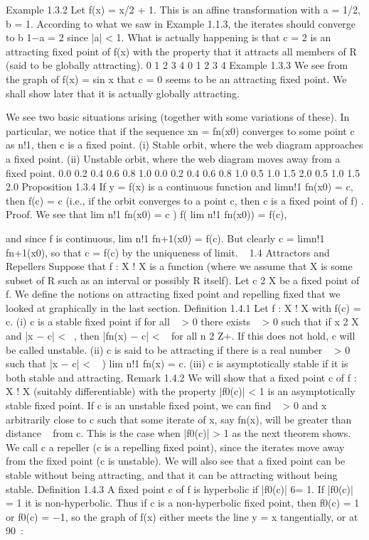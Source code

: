 \documentclass[12pt]{article}
\begin{document}
\begin{enumerate}
\begin{enumerate}
Example 1.3.2 Let f(x) = x/2 + 1. This is an affine transformation with a = 1/2,
b = 1. According to what we saw in Example 1.1.3, the iterates should converge to
b
1−a = 2 since |a| < 1. What is actually happening is that c = 2 is an attracting fixed
point of f(x) with the property that it attracts all members of R (said to be globally
attracting).
0 1 2 3 4
0
1
2
3
4
Example 1.3.3 We see from the graph of f(x) = sin x that c = 0 seems to be an
attracting fixed point. We shall show later that it is actually globally attracting.

We see two basic situations arising (together with some variations of these). In
particular, we notice that if the sequence xn = fn(x0) converges to some point c as
n!1, then c is a fixed point.
(i) Stable orbit, where the web diagram approaches a fixed point.
(ii) Unstable orbit, where the web diagram moves away from a fixed point.
0.0 0.2 0.4 0.6 0.8 1.0
0.0
0.2
0.4
0.6
0.8
1.0
0.5 1.0 1.5 2.0
0.5
1.0
1.5
2.0
Proposition 1.3.4 If y = f(x) is a continuous function and limn!1 fn(x0) = c,
then f(c) = c (i.e., if the orbit converges to a point c, then c is a fixed point of f) .
Proof. We see that
lim
n!1
fn(x0) = c ) f( lim
n!1
fn(x0)) = f(c),

and since f is continuous,
lim
n!1
fn+1(x0) = f(c).
But clearly c = limn!1 fn+1(x0), so that c = f(c) by the uniqueness of limit.  
1.4 Attractors and Repellers
Suppose that f : X ! X is a function (where we assume that X is some subset of
R such as an interval or possibly R itself). Let c 2 X be a fixed point of f. We define
the notions on attracting fixed point and repelling fixed that we looked at graphically
in the last section.
Definition 1.4.1 Let f : X ! X with f(c) = c.
(i) c is a stable fixed point if for all   > 0 there exists   > 0 such that if x 2 X and
|x − c| <  , then |fn(x) − c| <   for all n 2 Z+.
If this does not hold, c will be called unstable.
(ii) c is said to be attracting if there is a real number   > 0 such that
|x − c| <   ) lim
n!1
fn(x) = c.
(iii) c is asymptotically stable if it is both stable and attracting.
Remark 1.4.2 We will show that a fixed point c of f : X ! X (suitably differentiable)
with the property |f0(c)| < 1 is an asymptotically stable fixed point. If c
is an unstable fixed point, we can find   > 0 and x arbitrarily close to c such that
some iterate of x, say fn(x), will be greater than distance   from c. This is the case
when |f0(c)| > 1 as the next theorem shows. We call c a repeller (c is a repelling
fixed point), since the iterates move away from the fixed point (c is unstable). We will
also see that a fixed point can be stable without being attracting, and that it can be
attracting without being stable.
Definition 1.4.3 A fixed point c of f is hyperbolic if |f0(c)| 6= 1. If |f0(c)| = 1 it is
non-hyperbolic.
Thus if c is a non-hyperbolic fixed point, then f0(c) = 1 or f0(c) = −1, so the graph
of f(x) either meets the line y = x tangentially, or at 90 :


\end{enumerate}
\end{enumerate}
\end{document}
